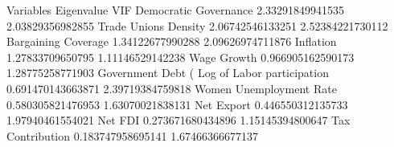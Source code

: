 Variables	Eigenvalue	VIF
Democratic Governance	2.33291849941535	2.03829356982855
Trade Unions Density	2.06742546133251	2.52384221730112
Bargaining Coverage	1.34122677990288	2.09626974711876
Inflation	1.27833709650795	1.11146529142238
Wage Growth	0.966905162590173	1.28775258771903
Government Debt (%
Log of Labor participation	0.691470143663871	2.39719384759818
Women Unemployment Rate	0.580305821476953	1.63070021838131
Net Export	0.446550312135733	1.97940461554021
Net FDI	0.273671680434896	1.15145394800647
Tax Contribution	0.183747958695141	1.67466366677137
